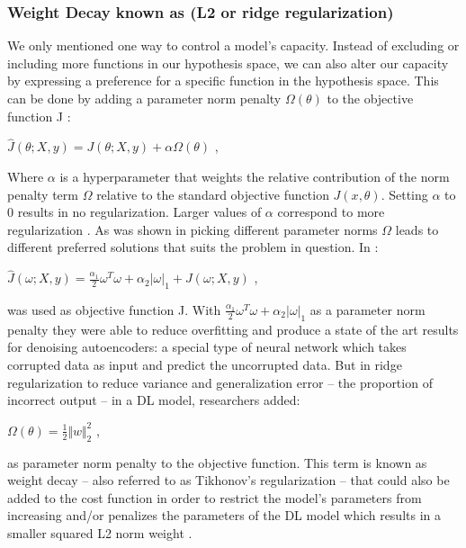 \documentclass[oneside,12pt,article]{article}
\begin{document}
\subsubsection{Weight Decay known as (L2 or ridge regularization)}
We only mentioned one way to control a model's capacity. Instead of excluding or including more functions in our hypothesis space, we can also alter our capacity by expressing a preference for a specific function in the hypothesis space. This can be done by adding a parameter norm penalty $\Omega (\theta)$ to the objective function J \cite{bengio2017deep} \cite{meng2018enhancement}:

 \begin{center}
$ \hat{J} (\theta; X,y) = J(\theta; X,y) + \alpha \Omega (\theta) $ ,
\end{center}
Where $\alpha $ is a hyperparameter that weights the relative contribution of the norm penalty term $\Omega$ relative to the standard objective function $J(x,\theta)$. Setting $\alpha $ to 0 results in no regularization. Larger values of $\alpha $ correspond to more regularization \cite{bengio2017deep} \cite{meng2018enhancement}. As was shown in \cite{meng2018enhancement} picking different parameter norms $\Omega$ leads to different preferred solutions that suits the problem in question. In \cite{meng2018enhancement}: 

 \begin{center}
$ \hat{J} (\omega; X,y) = \frac{\alpha_1}{2}\omega^T \omega +\alpha_2 | \omega |_1  +J(\omega; X,y) $ ,
\end{center}
was used as objective function J. With $ \frac{\alpha_1}{2}\omega^T \omega +\alpha_2 | \omega |_1 $ as a parameter norm penalty they were able to reduce overfitting and produce a state of the art results for denoising autoencoders: a special type of neural network which takes corrupted data as input and predict the uncorrupted data. But in ridge regularization to reduce variance and generalization error – the proportion of incorrect output – in a DL model, researchers added: 
 \begin{center}
 $\Omega (\theta) = \frac{1}{2} \Vert w \Vert^{2}_{2}$ ,
\end{center}
as parameter norm penalty to the objective function. This term is known as weight decay – also referred to as Tikhonov's regularization – that could also be added to the cost function in order to restrict the model's parameters from increasing and/or penalizes the parameters of the DL model which results in a smaller squared L2 norm weight \cite{kumarstudying} \cite{tikhonov1943stability}. 
\end{document}
